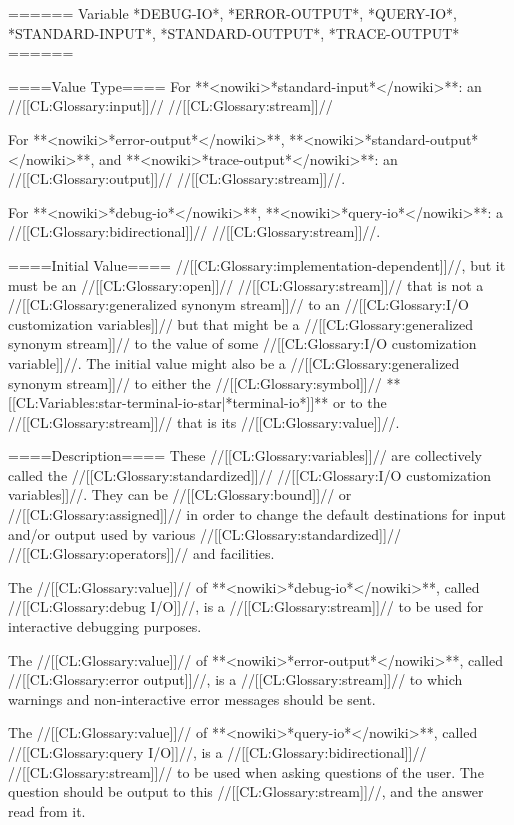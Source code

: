 ====== Variable *DEBUG-IO*, *ERROR-OUTPUT*, *QUERY-IO*, *STANDARD-INPUT*, *STANDARD-OUTPUT*, *TRACE-OUTPUT* ======

====Value Type====
For **<nowiki>*standard-input*</nowiki>**: an //[[CL:Glossary:input]]// //[[CL:Glossary:stream]]//

For **<nowiki>*error-output*</nowiki>**, **<nowiki>*standard-output*</nowiki>**, and **<nowiki>*trace-output*</nowiki>**: an //[[CL:Glossary:output]]// //[[CL:Glossary:stream]]//.

For **<nowiki>*debug-io*</nowiki>**, **<nowiki>*query-io*</nowiki>**: a //[[CL:Glossary:bidirectional]]// //[[CL:Glossary:stream]]//.

====Initial Value====
//[[CL:Glossary:implementation-dependent]]//, but it must be an //[[CL:Glossary:open]]// //[[CL:Glossary:stream]]// that is not a //[[CL:Glossary:generalized synonym stream]]// to an //[[CL:Glossary:I/O customization variables]]// but that might be a //[[CL:Glossary:generalized synonym stream]]// to the value of some //[[CL:Glossary:I/O customization variable]]//. The initial value might also be a //[[CL:Glossary:generalized synonym stream]]// to either the //[[CL:Glossary:symbol]]// **[[CL:Variables:star-terminal-io-star|*terminal-io*]]** or to the //[[CL:Glossary:stream]]// that is its //[[CL:Glossary:value]]//.

====Description====
These //[[CL:Glossary:variables]]// are collectively called the //[[CL:Glossary:standardized]]// //[[CL:Glossary:I/O customization variables]]//. They can be //[[CL:Glossary:bound]]// or //[[CL:Glossary:assigned]]// in order to change the default destinations for input and/or output used by various //[[CL:Glossary:standardized]]// //[[CL:Glossary:operators]]// and facilities.

The //[[CL:Glossary:value]]// of **<nowiki>*debug-io*</nowiki>**, called //[[CL:Glossary:debug I/O]]//, is a //[[CL:Glossary:stream]]// to be used for interactive debugging purposes.

The //[[CL:Glossary:value]]// of **<nowiki>*error-output*</nowiki>**, called //[[CL:Glossary:error output]]//, is a //[[CL:Glossary:stream]]// to which warnings and non-interactive error messages should be sent.

The //[[CL:Glossary:value]]// of **<nowiki>*query-io*</nowiki>**, called //[[CL:Glossary:query I/O]]//, is a //[[CL:Glossary:bidirectional]]// //[[CL:Glossary:stream]]// to be used when asking questions of the user. The question should be output to this //[[CL:Glossary:stream]]//, and the answer read from it.

